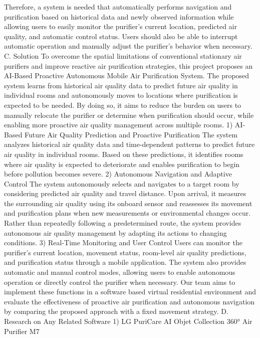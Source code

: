 Therefore, a system is needed that automatically performs navigation and purification based on historical data and newly observed information while allowing users to easily monitor the purifier's current location, predicted air quality, and automatic control status. Users should also be able to interrupt automatic operation and manually adjust the purifier's behavior when necessary.
C.	Solution
To overcome the spatial limitations of conventional stationary air purifiers and improve reactive air purification strategies, this project proposes an AI-Based Proactive Autonomous Mobile Air Purification System. The proposed system learns from historical air quality data to predict future air quality in individual rooms and autonomously moves to locations where purification is expected to be needed. By doing so, it aims to reduce the burden on users to manually relocate the purifier or determine when purification should occur, while enabling more proactive air quality management across multiple rooms.
1) AI-Based Future Air Quality Prediction and Proactive Purification
The system analyzes historical air quality data and time-dependent patterns to predict future air quality in individual rooms. Based on these predictions, it identifies rooms where air quality is expected to deteriorate and enables purification to begin before pollution becomes severe.
2) Autonomous Navigation and Adaptive Control
The system autonomously selects and navigates to a target room by considering predicted air quality and travel distance. Upon arrival, it measures the surrounding air quality using its onboard sensor and reassesses its movement and purification plans when new measurements or environmental changes occur. Rather than repeatedly following a predetermined route, the system provides autonomous air quality management by adapting its actions to changing conditions.
3) Real-Time Monitoring and User Control
Users can monitor the purifier's current location, movement status, room-level air quality predictions, and purification status through a mobile application. The system also provides automatic and manual control modes, allowing users to enable autonomous operation or directly control the purifier when necessary.
Our team aims to implement these functions in a software based virtual residential environment and evaluate the effectiveness of proactive air purification and autonomous navigation by comparing the proposed approach with a fixed movement strategy.
D. Research on Any Related Software
1) LG PuriCare AI Objet Collection 360° Air Purifier M7

